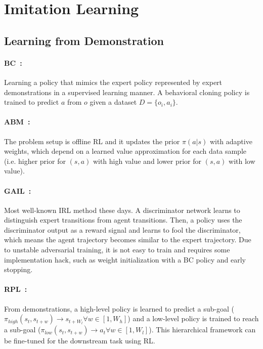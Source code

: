 \section{Imitation Learning}

\subsection{Learning from Demonstration}

\paragraph{BC~\citep{pomerleau1989alvinn}:}
Learning a policy that mimics the expert policy represented by expert demonstrations in a supervised learning manner. A behavioral cloning policy is trained to predict $a$ from $o$ given a dataset $D=\{o_i, a_i\}$.

\paragraph{ABM~\citep{siegel2020keep}:}
The problem setup is offline RL and it updates the prior $\pi(a|s)$ with adaptive weights, which depend on a learned value approximation for each data sample (i.e. higher prior for $(s, a)$ with high value and lower prior for $(s, a)$ with low value).

\paragraph{GAIL~\citep{ho2016generative}:}
Most well-known IRL method these days. A discriminator network learns to distinguish expert transitions from agent transitions. Then, a policy uses the discriminator output as a reward signal and learns to fool the discriminator, which means the agent trajectory becomes similar to the expert trajectory. Due to unstable adversarial training, it is not easy to train and requires some implementation hack, such as weight initialization with a BC policy and early stopping.

\paragraph{RPL~\citep{gupta2019relay}:}
From demonstrations, a high-level policy is learned to predict a sub-goal ($\pi_{high}(s_t, s_{t+w}) \rightarrow s_{t+W_l} \forall w \in [1,W_h]$) and a low-level policy is trained to reach a sub-goal ($\pi_{low}(s_t, s_{t+w}) \rightarrow a_t \forall w \in [1,W_l]$).
This hierarchical framework can be fine-tuned for the downstream task using RL.

